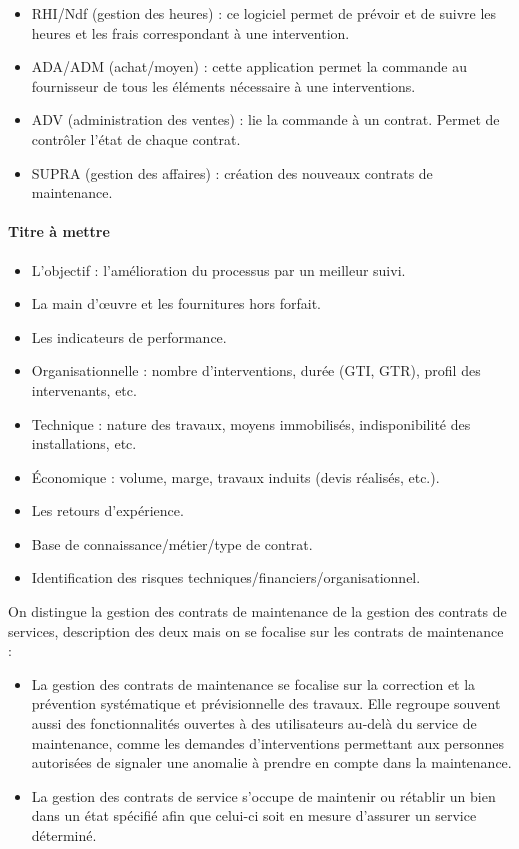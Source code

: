 \begin{itemize}
\item RHI/Ndf (gestion des heures) : ce logiciel permet de prévoir et de suivre les heures et les frais correspondant à une intervention.
\item ADA/ADM (achat/moyen) : cette application permet la commande au fournisseur de tous les éléments nécessaire à une interventions.
\item ADV (administration des ventes) : lie la commande à un contrat. Permet de contrôler l’état de chaque contrat.
\item SUPRA (gestion des affaires) : création des nouveaux contrats de maintenance.
\end{itemize}

\paragraph{Titre à mettre}

\begin{itemize}
\item L’objectif : l’amélioration du processus par un meilleur suivi.
\item La main d’œuvre et les fournitures hors forfait.
\item Les indicateurs de performance.
\item Organisationnelle : nombre d’interventions, durée (GTI, GTR), profil des intervenants, etc.
\item Technique : nature des travaux, moyens immobilisés, indisponibilité des installations, etc.
\item Économique : volume, marge, travaux induits (devis réalisés, etc.).
\item Les retours d’expérience.
\item Base de connaissance/métier/type de contrat.
\item Identification des risques techniques/financiers/organisationnel.
\end{itemize}

On distingue la gestion des contrats de maintenance de la gestion des contrats de services, description des deux mais on se focalise sur les contrats de maintenance :

\begin{itemize}
\item La gestion des contrats de maintenance se focalise sur la correction et la prévention systématique et prévisionnelle des travaux. Elle regroupe souvent aussi des fonctionnalités ouvertes à des utilisateurs au-delà du service de maintenance, comme les demandes d’interventions permettant aux personnes autorisées de signaler une anomalie à prendre en compte dans la maintenance.
\item La gestion des contrats de service s’occupe de maintenir ou rétablir un bien dans un état spécifié afin que celui-ci soit en mesure d’assurer un service déterminé.
\end{itemize}

